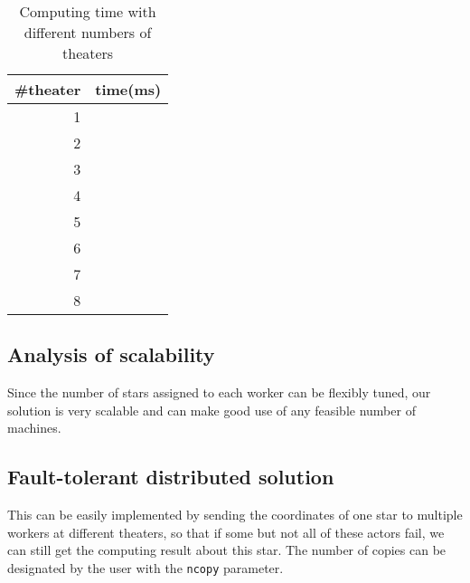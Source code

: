 \documentclass[12pt,letterpaper]{article}
\begin{document}
\begin{table}
\begin{center}
\caption{Computing time with different numbers of theaters}
\begin{tabular}{r|r}
\#theater & time(ms)\\
\hline
1 & \\
2 & \\
3 & \\
4 & \\
5 & \\
6 & \\
7 & \\
8 & \\
\end{tabular}
\end{center}
\end{table}

\subsection*{Analysis of scalability}
Since the number of stars assigned to each worker can be flexibly tuned, our solution is very scalable and can make good use of any feasible number of machines.

\subsection*{Fault-tolerant distributed solution}
This can be easily implemented by sending the coordinates of one star to multiple workers at different theaters, so that if some but not all of these actors fail, we can still get the computing result about this star. The number of copies can be designated by the user with the \texttt{ncopy} parameter.
\end{document}
